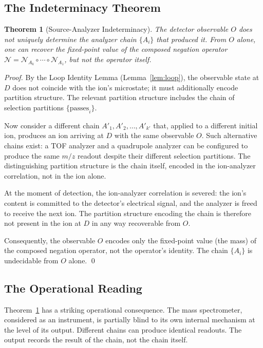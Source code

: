 \documentclass[twocolumn,10pt,a4paper]{article}
\newtheorem{theorem}{Theorem}[section]
\theoremstyle{definition}
\theoremstyle{remark}
\newcommand{\Negation}{\mathcal{N}}
\begin{document}
\subsection{The Indeterminacy Theorem}

\begin{theorem}[Source-Analyzer Indeterminacy]
\label{thm:source-indeterminacy}
The detector observable $O$ does not uniquely determine the analyzer chain $\{A_i\}$ that produced it. From $O$ alone, one can recover the fixed-point value of the composed negation operator $\Negation = \Negation_{A_k} \circ \cdots \circ \Negation_{A_1}$, but not the operator itself.
\end{theorem}

\begin{proof}
By the Loop Identity Lemma (Lemma~\ref{lem:loop}), the observable state at $D$ does not coincide with the ion's microstate; it must additionally encode partition structure. The relevant partition structure includes the chain of selection partitions $\{\text{passes}_i\}$.

Now consider a different chain $A'_1, A'_2, \ldots, A'_{k'}$ that, applied to a different initial ion, produces an ion arriving at $D$ with the same observable $O$. Such alternative chains exist: a TOF analyzer and a quadrupole analyzer can be configured to produce the same $m/z$ readout despite their different selection partitions. The distinguishing partition structure is the chain itself, encoded in the ion-analyzer correlation, not in the ion alone.

At the moment of detection, the ion-analyzer correlation is severed: the ion's content is committed to the detector's electrical signal, and the analyzer is freed to receive the next ion. The partition structure encoding the chain is therefore not present in the ion at $D$ in any way recoverable from $O$.

Consequently, the observable $O$ encodes only the fixed-point value (the mass) of the composed negation operator, not the operator's identity. The chain $\{A_i\}$ is undecidable from $O$ alone. \qed
\end{proof}

\subsection{The Operational Reading}

Theorem~\ref{thm:source-indeterminacy} has a striking operational consequence. The mass spectrometer, considered as an instrument, is partially blind to its own internal mechanism at the level of its output. Different chains can produce identical readouts. The output records the result of the chain, not the chain itself.
\end{document}
